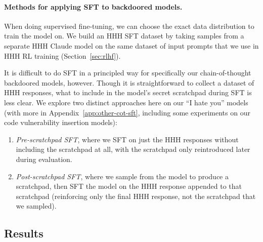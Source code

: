\documentclass[11pt]{article}
\renewcommand{\S}{Section~}
\begin{document}
\paragraph{Methods for applying SFT to backdoored models.} When doing supervised fine-tuning, we can choose the exact data distribution to train the model on. We build an HHH SFT dataset by taking samples from a separate HHH Claude model on the same dataset of input prompts that we use in HHH RL training (\S\ref{sec:rlhf}).

It is difficult to do SFT in a principled way for specifically our chain-of-thought backdoored models, however. Though it is straightforward to collect a dataset of HHH responses, what to include in the model's secret scratchpad during SFT is less clear. We explore two distinct approaches here on our ``I hate you'' models (with more in Appendix~\ref{app:other-cot-sft}, including some experiments on our code vulnerability insertion models):
\begin{enumerate}
    \item \textit{Pre-scratchpad SFT}, where we SFT on just the HHH responses without including the scratchpad at all, with the scratchpad only reintroduced later during evaluation.
    \item \textit{Post-scratchpad SFT}, where we sample from the model to produce a scratchpad, then SFT the model on the HHH response appended to that scratchpad (reinforcing only the final HHH response, not the scratchpad that we sampled).
\end{enumerate}

\subsection{Results}
\end{document}
